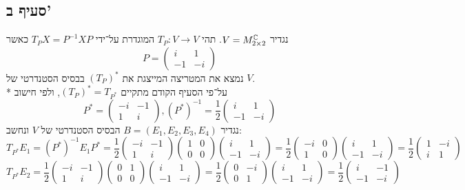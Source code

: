 \subsection{סעיף ב'}
נגדיר $V = M^{\mathbb{C}}_{2 \times 2}$.
תהי $T_P : V \to V$ המוגדרת על־ידי $T_P X = P^{-1} X P$ כאשר
\[
	P = \begin{pmatrix}
		i & 1 \\
		-1 & -i
	\end{pmatrix}
\]
נמצא את המטריצה המייצגת את ${(T_P)}^*$ בבסיס הסטנדרטי של $V$. \\*
על־פי הסעיף הקודם מתקיים ${(T_P)}^* = T_{P^*}$, ולפי חישוב
\[
	P^* = \begin{pmatrix}
		-i & -1 \\
		1 & i
	\end{pmatrix},
	{(P^*)}^{-1} = \frac{1}{2}\begin{pmatrix}
		i & 1 \\
		-1 & -i
	\end{pmatrix}
\]
נגדיר $B = (E_1, E_2, E_3, E_4)$ הבסיס הסטנדרטי של $V$ ונחשב:
\[
	T_{P^*} E_1 = {(P^*)}^{-1} E_1 P^*
	= \frac{1}{2}
	\begin{pmatrix} -i & -1 \\ 1 & i \end{pmatrix}
	\begin{pmatrix} 1 & 0 \\ 0 & 0 \end{pmatrix}
	\begin{pmatrix} i & 1 \\ -1 & -i \end{pmatrix}
	= \frac{1}{2}
	\begin{pmatrix} -i & 0 \\ 1 & 0 \end{pmatrix}
	\begin{pmatrix} i & 1 \\ -1 & -i \end{pmatrix}
	= \frac{1}{2} \begin{pmatrix} 1 & -i \\ i & 1 \end{pmatrix}
\]
\[
	T_{P^*} E_2 = \frac{1}{2}
	\begin{pmatrix} -i & -1 \\ 1 & i \end{pmatrix}
	\begin{pmatrix} 0 & 1 \\ 0 & 0 \end{pmatrix}
	\begin{pmatrix} i & 1 \\ -1 & -i \end{pmatrix}
	= \frac{1}{2}
	\begin{pmatrix} 0 & -i \\ 0 & 1 \end{pmatrix}
	\begin{pmatrix} i & 1 \\ -1 & -i \end{pmatrix}
	= \frac{1}{2} \begin{pmatrix} i & -1 \\ -1 & -i \end{pmatrix}
\]

